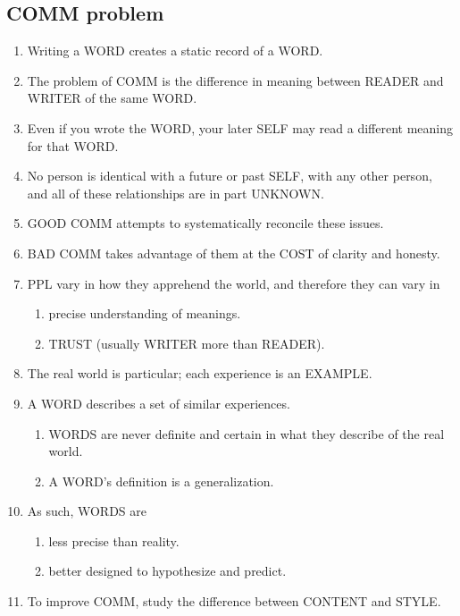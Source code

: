 \documentclass[
]{book}
\providecommand{\tightlist}{%
  \setlength{\itemsep}{0pt}\setlength{\parskip}{0pt}}
\begin{document}
\hypertarget{comm-problem}{%
\subsection{COMM problem}\label{comm-problem}}

\begin{enumerate}
\def\labelenumi{\arabic{enumi}.}
\setcounter{enumi}{46}
\tightlist
\item
  Writing a WORD creates a static record of a WORD.
\item
  The problem of COMM is the difference in meaning between READER
  and WRITER of the same WORD.
\item
  Even if you wrote the WORD, your later SELF may read a different
  meaning for that WORD.
\item
  No person is identical with a future or past SELF, with any other
  person, and all of these relationships are in part UNKNOWN.
\item
  GOOD COMM attempts to systematically reconcile these issues.
\item
  BAD COMM takes advantage of them at the COST of clarity and
  honesty.
\item
  PPL vary in how they apprehend the world, and therefore they can vary in

  \begin{enumerate}
  \def\labelenumii{\arabic{enumii}.}
  \tightlist
  \item
    precise understanding of meanings.
  \item
    TRUST (usually WRITER more than READER).
  \end{enumerate}
\item
  The real world is particular; each experience is an EXAMPLE.
\item
  A WORD describes a set of similar experiences.

  \begin{enumerate}
  \def\labelenumii{\arabic{enumii}.}
  \tightlist
  \item
    WORDS are never definite and certain in what they describe of the real world.
  \item
    A WORD's definition is a generalization.
  \end{enumerate}
\item
  As such, WORDS are

  \begin{enumerate}
  \def\labelenumii{\arabic{enumii}.}
  \tightlist
  \item
    less precise than reality.
  \item
    better designed to hypothesize and predict.
  \end{enumerate}
\item
  To improve COMM, study the difference between CONTENT and STYLE.
\end{enumerate}
\end{document}
